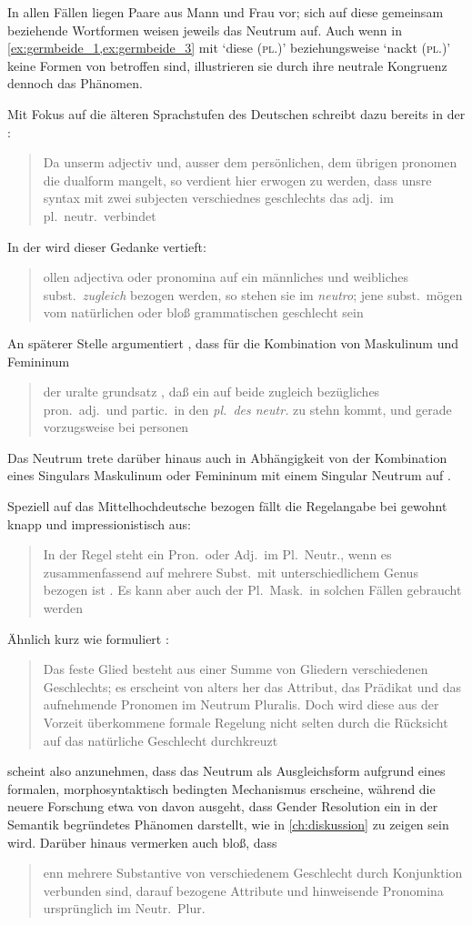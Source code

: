 In allen Fällen liegen Paare aus Mann und Frau vor; sich auf diese gemeinsam
beziehende Wortformen weisen jeweils das Neutrum auf. Auch wenn in
\cref{ex:germbeide_1,ex:germbeide_3} mit  `diese
(\textsc{pl.\NeutMF})' beziehungsweise  `nackt
(\textsc{pl.\NeutMF})' keine Formen von  betroffen sind,
illustrieren sie durch ihre neutrale Kongruenz dennoch das Phänomen.

Mit Fokus auf die älteren Sprachstufen des Deutschen schreibt dazu bereits
\citeauthor{grimm1848} in der :
\blockcquote[978]{grimm1848}{Da unserm adjectiv und, ausser dem
persönlichen, dem übrigen pronomen die dualform mangelt, so verdient hier
erwogen zu werden, dass unsre syntax mit zwei subjecten verschiednes
geschlechts das adj.\ im pl.~neutr.\ verbindet}. In der  wird dieser Gedanke vertieft:
\blockcquote[311--312]{grimm1890}{ollen adjectiva oder pronomina
auf ein männliches und weibliches subst.\ \emph{zugleich} bezogen werden, so
stehen sie im \emph{neutro}; jene subst.\ mögen vom natürlichen oder bloß
grammatischen geschlecht sein}. An späterer Stelle argumentiert
\citeauthor{grimm1898}, dass für die Kombination von Maskulinum und Femininum
\blockcquote[329]{grimm1898}{der uralte grundsatz , daß ein auf
beide zugleich bezügliches pron.\ adj.\ und partic.\ in den \emph{pl.\ des
neutr.} zu stehn kommt, und gerade vorzugsweise bei personen}. Das Neutrum
trete darüber hinaus auch in Abhängigkeit von der Kombination eines Singulars
Maskulinum oder Femininum mit einem Singular Neutrum auf
\autocite[331]{grimm1898}.

Speziell auf das Mittelhochdeutsche bezogen fällt die Regelangabe bei
\citeauthor{paul2007} gewohnt knapp und impressionistisch aus:
\blockcquote[384]{paul2007}{In der Regel steht ein Pron.\ oder Adj.\ im
Pl.~Neutr., wenn es zusammenfassend auf mehrere Subst.\ mit unterschiedlichem
Genus bezogen ist \textelp{}. Es kann aber auch der Pl.~Mask.\ in solchen
Fällen gebraucht werden}. Ähnlich kurz wie \citet{paul2007} formuliert
\citet[39]{behaghel1928}: \blockquote{Das feste Glied besteht aus einer Summe
von Gliedern verschiedenen Geschlechts; es erscheint von alters her das
Attribut, das Prädikat und das aufnehmende Pronomen im Neutrum Pluralis.
\textelp{} Doch wird diese aus der Vorzeit überkommene formale Regelung nicht
selten durch die Rücksicht auf das natürliche Geschlecht durchkreuzt}.

\citet{behaghel1928} scheint also anzunehmen, dass das Neutrum als
Ausgleichsform aufgrund eines formalen, morphosyntaktisch bedingten Mechanismus
erscheine, während die neuere Forschung etwa von
\citet{wechslerzlatic2003,wechsler2009} davon ausgeht, dass Gender Resolution
ein in der Semantik begründetes Phänomen darstellt, wie in \cref{ch:diskussion}
zu zeigen sein wird. Darüber hinaus vermerken auch \citet[188]{dal2014} bloß,
dass \blockquote{enn mehrere Substantive von verschiedenem
Geschlecht durch Konjunktion verbunden sind, \textelp{} darauf bezogene
Attribute und hinweisende Pronomina ursprünglich im Neutr.\ Plur.\
}.

